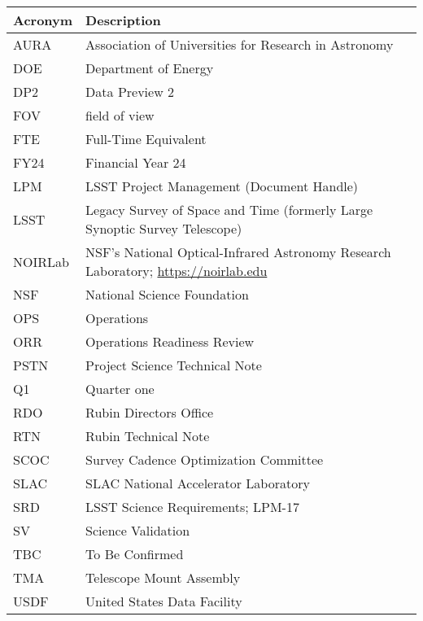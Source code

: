 \addtocounter{table}{-1}
\begin{longtable}{p{}p{}}\hline
\textbf{Acronym} & \textbf{Description}  \\\hline

AURA & Association of Universities for Research in Astronomy \\\hline
DOE & Department of Energy \\\hline
DP2 & Data Preview 2 \\\hline
FOV & field of view \\\hline
FTE & Full-Time Equivalent \\\hline
FY24 & Financial Year 24 \\\hline
LPM & LSST Project Management (Document Handle) \\\hline
LSST & Legacy Survey of Space and Time (formerly Large Synoptic Survey Telescope) \\\hline
NOIRLab & NSF's National Optical-Infrared Astronomy Research Laboratory; \url{https://noirlab.edu} \\\hline
NSF & National Science Foundation \\\hline
OPS & Operations \\\hline
ORR & Operations Readiness Review \\\hline
PSTN & Project Science Technical Note \\\hline
Q1 & Quarter one \\\hline
RDO & Rubin Directors Office \\\hline
RTN & Rubin Technical Note \\\hline
SCOC & Survey Cadence Optimization Committee \\\hline
SLAC & SLAC National Accelerator Laboratory \\\hline
SRD & LSST Science Requirements; LPM-17 \\\hline
SV & Science Validation \\\hline
TBC & To Be Confirmed \\\hline
TMA & Telescope Mount Assembly \\\hline
USDF & United States Data Facility \\\hline
\end{longtable}
